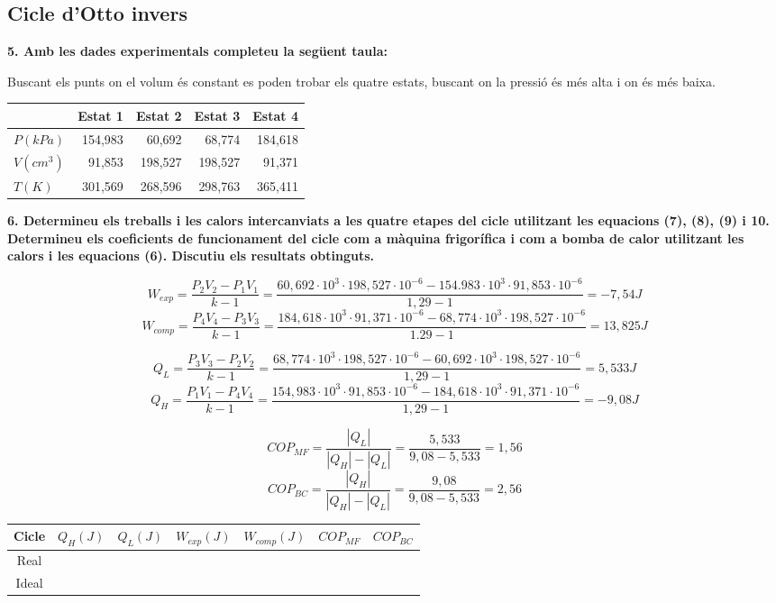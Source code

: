 \documentclass[a4paper]{article}
\begin{document}
\subsection*{Cicle d'Otto invers}

\textbf{5. Amb les dades experimentals completeu la següent taula:}

Buscant els punts on el volum és constant es poden trobar els quatre estats, buscant on la pressió és més alta i on és més baixa.

\begin{center}
	\begin{tabular}{l|rrrr}
		& Estat 1 & Estat 2 & Estat 3 & Estat 4 \\
		\hline
		$P(kPa)$ & 154,983 & 60,692 & 68,774 & 184,618 \\
		$V(cm^3)$ & 91,853 & 198,527 & 198,527 & 91,371 \\
		$T(K)$ & 301,569 & 268,596 & 298,763 & 365,411 \\
	\end{tabular}
\end{center}

\textbf{6. Determineu els treballs i les calors intercanviats a les quatre etapes del cicle utilitzant les equacions (7), (8), (9) i 10. Determineu els coeficients de funcionament del cicle com a màquina frigorífica i com a bomba de calor utilitzant les calors i les equacions (6). Discutiu els resultats obtinguts.}

$$ W_{exp} = \frac{P_2 V_2 - P_1 V_1}{k - 1} = 
\frac{60,692·10^3 · 198,527·10^{-6} - 154.983·10^3 · 91,853·10^{-6}}{1,29 - 1} =
\boxed{-7,54J} 
$$
$$ W_{comp} = \frac{P_4 V_4 - P_3 V_3}{k - 1} = 
\frac{184,618·10^3 · 91,371·10^{-6} - 68,774·10^3 · 198,527·10^{-6}}{1.29 - 1} =
\boxed{13,825J}
$$

$$ Q_L = \frac{P_3 V_3 - P_2 V_2}{k - 1} = 
\frac{68,774·10^3 · 198,527·10^{-6} - 60,692·10^3 · 198,527·10^{-6}}{1,29 - 1} = 
\boxed{5,533J}
$$
$$ Q_H = \frac{P_1 V_1 - P_4 V_4}{k - 1} =
\frac{154,983·10^3 · 91,853·10^{-6} - 184,618·10^3 · 91,371·10^{-6}}{1,29 - 1} =
\boxed{-9,08J}
$$

$$ COP_{MF} = \frac{|Q_L|}{|Q_H| - |Q_L|} =
\frac{5,533}{9,08 - 5,533} = \boxed{1,56} $$
$$ COP_{BC} = \frac{|Q_H|}{|Q_H| - |Q_L|} =
\frac{9,08}{9,08 - 5,533} = \boxed{2,56} $$

\begin{tabular}{c|cccccc}
    Cicle & $Q_H(J)$ & $Q_L(J)$ & $W_{exp}(J)$ & $W_{comp}(J)$ & $COP_{MF}$ & $COP_{BC}$ \\
    \hline
    Real & & & & & & \\
    Ideal & & & & & &
\end{tabular}
\end{document}
